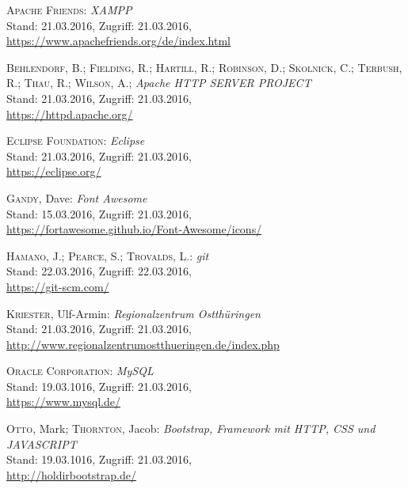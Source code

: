 

\begin{thebibliography}{999}

 \textsc{Apache Friends}: \textit{XAMPP}\\
			{\small Stand: 21.03.2016, Zugriff: 21.03.2016,} \\
			\url{https://www.apachefriends.org/de/index.html}
			
 \textsc{Behlendorf}, B.; \textsc{Fielding}, R.; \textsc{Hartill}, R.; \textsc{Robinson}, D.; \textsc{Skolnick}, C.; \textsc{Terbush}, R.; \textsc{Thau}, R.; \textsc{Wilson}, A.; \textit{Apache HTTP SERVER PROJECT}\\
			{\small Stand: 21.03.2016, Zugriff: 21.03.2016,} \\
			\url{https://httpd.apache.org/}
			
 \textsc{Eclipse Foundation}: \textit{Eclipse}\\
			{\small Stand: 21.03.2016, Zugriff: 21.03.2016,} \\
			\url{https://eclipse.org/}

 \textsc{Gandy}, Dave: \textit{Font Awesome}\\
			{\small Stand: 15.03.2016, Zugriff: 21.03.2016,} \\
			\url{https://fortawesome.github.io/Font-Awesome/icons/}
			
 \textsc{Hamano}, J.; \textsc{Pearce}, S.; \textsc{Trovalds}, L.: \textit{git}\\
			{\small Stand: 22.03.2016, Zugriff: 22.03.2016,} \\
			\url{https://git-scm.com/}			
			
 \textsc{Kriester}, Ulf-Armin: \textit{Regionalzentrum Ostthüringen}\\
			{\small Stand: 21.03.2016, Zugriff: 21.03.2016,} \\
			\url{http://www.regionalzentrumostthueringen.de/index.php}
			
 \textsc{Oracle Corporation}: \textit{MySQL}\\
			{\small Stand: 19.03.1016, Zugriff: 21.03.2016,}\\
			\url{https://www.mysql.de/}

 \textsc{Otto}, Mark; \textsc{Thornton}, Jacob: \textit{Bootstrap, Framework mit HTTP, CSS und JAVASCRIPT}\\
			{\small Stand: 19.03.1016, Zugriff: 21.03.2016,}\\
			\url{http://holdirbootstrap.de/}
			

\end{thebibliography}
